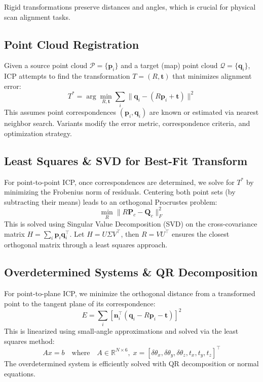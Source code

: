 \documentclass[11pt]{article}
\begin{document}
Rigid transformations preserve distances and angles, which is crucial for physical scan alignment tasks.

\subsection{Point Cloud Registration}

Given a source point cloud $\mathcal{P} = \{\mathbf{p}_i\}$ and a target (map) point cloud $\mathcal{Q} = \{\mathbf{q}_i\}$, ICP attempts to find the transformation $T = (R, \mathbf{t})$ that minimizes alignment error:
\[
T^* = \arg\min_{R, \mathbf{t}} \sum_i \| \mathbf{q}_i - (R\mathbf{p}_i + \mathbf{t}) \|^2
\]
This assumes point correspondences $(\mathbf{p}_i, \mathbf{q}_i)$ are known or estimated via nearest neighbor search. Variants modify the error metric, correspondence criteria, and optimization strategy.

\subsection{Least Squares \& SVD for Best-Fit Transform}

For point-to-point ICP, once correspondences are determined, we solve for $T^*$ by minimizing the Frobenius norm of residuals. Centering both point sets (by subtracting their means) leads to an orthogonal Procrustes problem:
\[
\min_R \| R\mathbf{P}_c - \mathbf{Q}_c \|_F^2
\]
This is solved using Singular Value Decomposition (SVD) on the cross-covariance matrix $H = \sum_i \mathbf{p}_i \mathbf{q}_i^\top$. Let $H = U\Sigma V^\top$, then $R = VU^\top$ ensures the closest orthogonal matrix through a least squares approach.

\subsection{Overdetermined Systems \& QR Decomposition}

For point-to-plane ICP, we minimize the orthogonal distance from a transformed point to the tangent plane of its correspondence:
\[
E = \sum_i \left[ \mathbf{n}_i^\top (\mathbf{q}_i - R\mathbf{p}_i - \mathbf{t}) \right]^2
\]
This is linearized using small-angle approximations and solved via the least squares method:
\[
Ax = b \quad \text{where} \quad A \in \mathbb{R}^{N \times 6},\; x = [\delta \theta_x, \delta \theta_y, \delta \theta_z, t_x, t_y, t_z]^\top
\]
The overdetermined system is efficiently solved with QR decomposition or normal equations.
\end{document}

